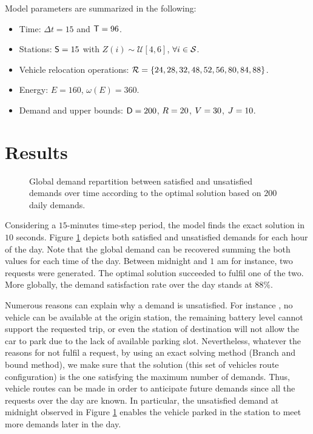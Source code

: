 \begin{bibunit}[ieeetr]
\medskip\noindent
Model parameters are summarized in the following:
\begin{itemize}
\item Time: $\Delta t = 15$ and $\mathsf{T} = 96$.
\item Stations: $\mathsf{S} = 15$ with $Z(i) \sim \mathcal{U}[4,6]$, $\forall i \in \mathcal{S}$.
\item Vehicle relocation operations: $\mathcal{R} = \{24, 28, 32 ,48, 52, 56, 80, 84, 88\}$.
\item Energy: $E = 160$, $\omega (E) = 360$.
\item Demand and upper bounds: $\mathsf{D} = 200$, $R = 20$, $V = 30$,  $J = 10$.
\end{itemize}


\section{Results} \label{sec:energyExp:results}

\begin{figure}[t]
\flushleft

\caption{Global demand repartition between satisfied and unsatisfied demands over time according to the optimal solution based on $200$ daily demands.}
\label{fig:plotDemand}
\end{figure}

\medskip
Considering a $15$-minutes time-step period, the model finds the exact solution in $10$ seconds.
Figure \ref{fig:plotDemand} depicts both satisfied and unsatisfied demands for each hour of the day.
Note that the global demand can be recovered summing the both values for each time of the day.
Between midnight and $1$ am for instance, two requests were generated.
The optimal solution succeeded to fulfil one of the two.
More globally, the demand satisfaction rate over the day stands at $88$\%.

\medskip
Numerous reasons can explain why a demand is unsatisfied.
For instance , no vehicle can be available at the origin station, the remaining battery level cannot support the requested trip, or even the station of destination will not allow the car to park due to the lack of available parking slot.
Nevertheless, whatever the reasons for not fulfil a request, by using an exact solving method (Branch and bound method), we make sure that the solution (\ie this set of vehicles route configuration) is the one satisfying the maximum number of demands.
Thus, vehicle routes can be made in order to anticipate future demands since all the requests over the day are known.
In particular, the unsatisfied demand at midnight observed in Figure \ref{fig:plotDemand} enables the vehicle parked in the station to meet more demands later in the day.


\end{bibunit}
